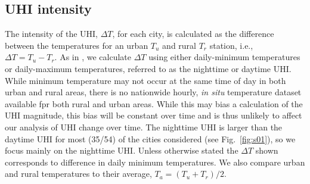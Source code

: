 \subsection{UHI intensity}
The intensity of the UHI, $\Delta T$, for each city, is calculated as the difference between the temperatures for an urban $T_u$ and rural $T_r$ station, i.e., $\Delta T = T_{u} - T_{r}$. As in \cite{zhou2010atlanta}, we calculate $\Delta T$ using either daily-minimum temperatures or daily-maximum temperatures, referred to as the nighttime or daytime UHI. While minimum temperature may not occur at the same time of day in both urban and rural areas, there is no nationwide hourly, \textit{in situ} temperature dataset available fpr both rural and urban areas. While this may bias a calculation of the UHI magnitude, this bias will be constant over time and is thus unlikely to affect our analysis of UHI change over time. 
The nighttime UHI is larger than the daytime UHI for most (35/54) of the cities considered  (see Fig.~\ref{fig:s01}), so we focus mainly on the nighttime UHI. Unless otherwise stated the $\Delta T$ shown corresponds to difference in daily minimum temperatures. We also compare urban and rural temperatures to their average, $T_{a} = (T_u + T_r)/2$. %
